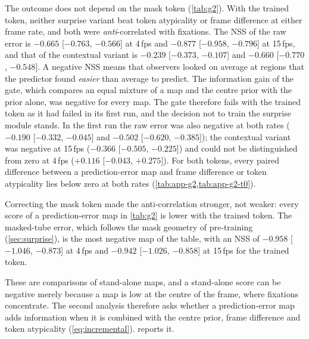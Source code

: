 The outcome does not depend on the mask token (\cref{tab:g2}). With the trained
token, neither surprise variant beat token atypicality or frame difference at
either frame rate, and both were \emph{anti}-correlated with fixations. The
\acrshort{NSS} of the raw error is $-0.665$ [$-0.763$, $-0.566$] at 4\,fps and
$-0.877$ [$-0.958$, $-0.796$] at 15\,fps, and that of the contextual variant is
$-0.239$ [$-0.373$, $-0.107$] and $-0.660$ [$-0.770$, $-0.548$]. A negative
\acrshort{NSS} means that observers looked on average at regions that the
predictor found \emph{easier} than average to predict. The information gain of
the gate, which compares an equal mixture of a map and the centre prior with
the prior alone, was negative for every map. The gate therefore fails with the
trained token as it had failed in its first run, and the decision not to train
the surprise module stands. In the first run the raw error was also negative
at both rates ($-0.190$ [$-0.332$, $-0.045$] and $-0.502$ [$-0.620$,
$-0.385$]); the contextual variant was negative at 15\,fps ($-0.366$ [$-0.505$,
$-0.225$]) and could not be distinguished from zero at 4\,fps ($+0.116$
[$-0.043$, $+0.275$]). For both tokens, every paired difference between a
prediction-error map and frame difference or token atypicality lies below zero
at both rates (\cref{tab:app-g2,tab:app-g2-t0}).

Correcting the mask token made the anti-correlation stronger, not weaker: every
score of a prediction-error map in \cref{tab:g2} is lower with the trained
token. The masked-tube error, which follows the mask geometry of pre-training
(\cref{sec:surprise}), is the most negative map of the table, with an
\acrshort{NSS} of $-0.958$ [$-1.046$, $-0.873$] at 4\,fps and $-0.942$
[$-1.026$, $-0.858$] at 15\,fps for the trained token.

These are comparisons of stand-alone maps, and a stand-alone score can be
negative merely because a map is low at the centre of the frame, where
fixations concentrate. The second analysis therefore asks whether a
prediction-error map adds information when it is combined with the centre
prior, frame difference and token atypicality (\cref{eq:incremental}).
 reports it.

